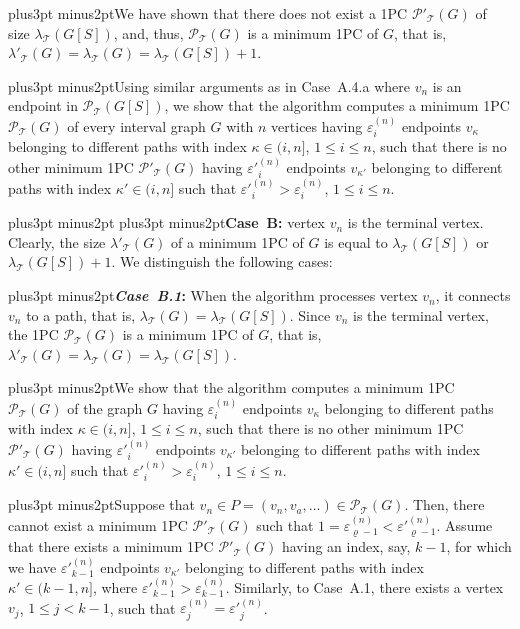 \documentclass[10pt]{article}
\def\yskip{\penalty-50\vskip3pt plus3pt minus2pt}
\def\y{\yskip}
\def\yy{\yskip\yskip}
\begin{document}
{\y We have shown that there does not exist a 1PC
$\mathcal{P'_{\mathcal{T}}}(G)$ of size
$\lambda_\mathcal{T}(G[S])$, and, thus,
$\mathcal{P_{\mathcal{T}}}(G)$ is a minimum 1PC of $G$, that is,
$\lambda'_\mathcal{T}(G)=\lambda_\mathcal{T}(G)=\lambda_\mathcal{T}(G[S])+1$.

\y Using similar arguments as in Case~A.4.a where $v_n$ is an
endpoint in $\mathcal{P_{\mathcal{T}}}(G[S])$, we show that the
algorithm computes a minimum 1PC $\mathcal{P_{\mathcal{T}}}(G)$ of
every interval graph $G$ with $n$ vertices having
$\varepsilon^{(n)}_i$ endpoints $v_\kappa$ belonging to different
paths with index $\kappa \in (i,n]$, $1 \leq i \leq n$, such that
there is no other minimum 1PC $\mathcal{P'_{\mathcal{T}}}(G)$
having $\varepsilon'^{(n)}_i$ endpoints $v_{\kappa'}$ belonging to
different paths with index $\kappa' \in (i,n]$ such that
$\varepsilon'^{(n)}_i>\varepsilon^{(n)}_i$, $1 \leq i \leq n$.

\yy {\bf Case~B:} vertex $v_n$ is the terminal vertex. Clearly,
the size $\lambda'_\mathcal{T}(G)$ of a minimum 1PC of $G$ is
equal to $\lambda_\mathcal{T}(G[S])$ or
$\lambda_\mathcal{T}(G[S])+1$. We distinguish the following cases:

\y {\bf \textit{Case~B.1}:} When the algorithm processes vertex
$v_n$, it connects $v_n$ to a path, that is,
$\lambda_\mathcal{T}(G)=\lambda_\mathcal{T}(G[S])$. Since $v_n$ is
the terminal vertex, the 1PC $\mathcal{P_{\mathcal{T}}}(G)$ is a
minimum 1PC of $G$, that is,
$\lambda'_\mathcal{T}(G)=\lambda_\mathcal{T}(G)=\lambda_\mathcal{T}(G[S])$.

\y We show that the algorithm computes a minimum 1PC
$\mathcal{P_{\mathcal{T}}}(G)$ of the graph $G$ having
$\varepsilon^{(n)}_i$ endpoints $v_\kappa$ belonging to different
paths with index $\kappa \in (i,n]$, $1 \leq i \leq n$, such that
there is no other minimum 1PC $\mathcal{P'_{\mathcal{T}}}(G)$
having $\varepsilon'^{(n)}_i$ endpoints $v_{\kappa'}$ belonging to
different paths with index $\kappa' \in (i,n]$ such that
$\varepsilon'^{(n)}_i>\varepsilon^{(n)}_i$, $1 \leq i \leq n$.

\y Suppose that $v_n \in P=(v_n, v_a, \ldots) \in
\mathcal{P_{\mathcal{T}}}(G)$. Then, there cannot exist a minimum
1PC $\mathcal{P'_{\mathcal{T}}}(G)$ such that $1=
\varepsilon^{(n)}_{\varrho-1} < \varepsilon'^{(n)}_{\varrho-1}$.
Assume that there exists a minimum 1PC
$\mathcal{P'_{\mathcal{T}}}(G)$ having an index, say, $k-1$, for
which we have $\varepsilon'^{(n)}_{k-1}$ endpoints $v_{\kappa'}$
belonging to different paths with index $\kappa' \in (k-1,n]$,
where $\varepsilon'^{(n)}_{k-1}>\varepsilon^{(n)}_{k-1}$.
Similarly, to Case~A.1, there exists a vertex $v_j$, $1 \leq j <
k-1$, such that $\varepsilon^{(n)}_j = \varepsilon'^{(n)}_j$.

}
\end{document}

